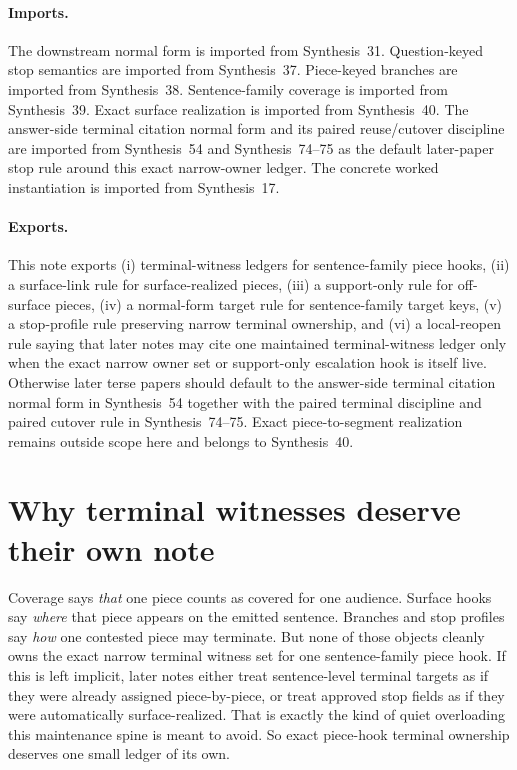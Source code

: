 \documentclass[11pt]{article}
\begin{document}
\paragraph{Imports.}
The downstream normal form is imported from Synthesis~31.\cite{series:downstreamnormalforms}
Question-keyed stop semantics are imported from Synthesis~37.\cite{series:challengestops}
Piece-keyed branches are imported from Synthesis~38.\cite{series:challengebranches}
Sentence-family coverage is imported from Synthesis~39.\cite{series:challengecoverage}
Exact surface realization is imported from Synthesis~40.\cite{series:challengesurfacehooks}
The answer-side terminal citation normal form and its paired reuse/cutover discipline are imported from Synthesis~54 and Synthesis~74--75 as the default later-paper stop rule around this exact narrow-owner ledger.\cite{series:challengeanswerreviewmenus,series:pairedterminalcitationdiscipline,series:pairedterminalcutoverrules}
The concrete worked instantiation is imported from Synthesis~17.\cite{series:workedexample}
\paragraph{Exports.}
This note exports (i) terminal-witness ledgers for sentence-family piece hooks, (ii) a surface-link rule for surface-realized pieces, (iii) a support-only rule for off-surface pieces, (iv) a normal-form target rule for sentence-family target keys, (v) a stop-profile rule preserving narrow terminal ownership, and (vi) a local-reopen rule saying that later notes may cite one maintained terminal-witness ledger only when the exact narrow owner set or support-only escalation hook is itself live.
Otherwise later terse papers should default to the answer-side terminal citation normal form in Synthesis~54 together with the paired terminal discipline and paired cutover rule in Synthesis~74--75. Exact piece-to-segment realization remains outside scope here and belongs to Synthesis~40.\cite{series:challengesurfacehooks,series:challengeanswerreviewmenus,series:pairedterminalcitationdiscipline,series:pairedterminalcutoverrules}
\section{Why terminal witnesses deserve their own note}
Coverage says \emph{that} one piece counts as covered for one audience.
Surface hooks say \emph{where} that piece appears on the emitted sentence.
Branches and stop profiles say \emph{how} one contested piece may terminate.
But none of those objects cleanly owns the exact narrow terminal witness set for one sentence-family piece hook.
If this is left implicit, later notes either treat sentence-level terminal targets as if they were already assigned piece-by-piece, or treat approved stop fields as if they were automatically surface-realized.
That is exactly the kind of quiet overloading this maintenance spine is meant to avoid.
So exact piece-hook terminal ownership deserves one small ledger of its own.
\end{document}
